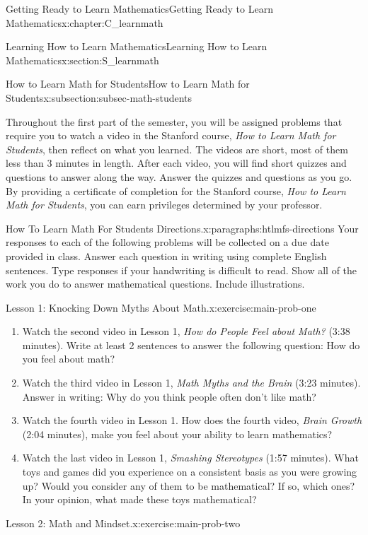 \documentclass[oneside,10pt,]{book}
\newcommand{\pubtitle}[1]{\textsl{#1}}
\numberwithin{equation}{chapter}
\begin{document}
\begin{chapterptx}{Getting Ready to Learn Mathematics}{}{Getting Ready to Learn Mathematics}{}{}{x:chapter:C_learnmath}
\begin{sectionptx}{Learning How to Learn Mathematics}{}{Learning How to Learn Mathematics}{}{}{x:section:S_learnmath}
\begin{subsectionptx}{How to Learn Math for Students}{}{How to Learn Math for Students}{}{}{x:subsection:subsec-math-students}
\par
Throughout the first part of the semester, you will be assigned problems that require you to watch a video in the Stanford course, \pubtitle{How to Learn Math for Students}, then reflect on what you learned. The videos are short, most of them less than 3 minutes in length. After each video, you will find short quizzes and questions to answer along the way. Answer the quizzes and questions as you go. By providing a certificate of completion for the Stanford course, \pubtitle{How to Learn Math for Students}, you can earn privileges determined by your professor.%
\begin{paragraphs}{How To Learn Math For Students Directions.}{x:paragraphs:htlmfs-directions}%
Your responses to each of the following problems will be collected on a due date provided in class. Answer each question in writing using complete English sentences. Type responses if your handwriting is difficult to read. Show all of the work you do to answer mathematical questions. Include illustrations.%
\begin{inlineexercise}{Lesson 1: Knocking Down Myths About Math.}{x:exercise:main-prob-one}%
\begin{enumerate}[font=\bfseries,label=(\alph*),ref=\alph*]
\item{}Watch the second video in Lesson 1, \pubtitle{How do People Feel about Math?} (3:38 minutes). Write at least 2 sentences to answer the following question: How do you feel about math?%
\item{}Watch the third video in Lesson 1, \pubtitle{Math Myths and the Brain} (3:23 minutes). Answer in writing: Why do you think people often don't like math?%
\item{}Watch the fourth video in Lesson 1. How does the fourth video, \pubtitle{Brain Growth} (2:04 minutes), make you feel about your ability to learn mathematics?%
\item{}Watch the last video in Lesson 1, \pubtitle{Smashing Stereotypes} (1:57 minutes). What toys and games did you experience on a consistent basis as you were growing up? Would you consider any of them to be mathematical? If so, which ones? In your opinion, what made these toys mathematical?%
\end{enumerate}
\end{inlineexercise}%
\begin{inlineexercise}{Lesson 2: Math and Mindset.}{x:exercise:main-prob-two}%
\begin{enumerate}[font=\bfseries,label=(\alph*),ref=\alph*]

\end{enumerate}
\end{inlineexercise}
\end{paragraphs}
\end{subsectionptx}
\end{sectionptx}
\end{chapterptx}
\end{document}

